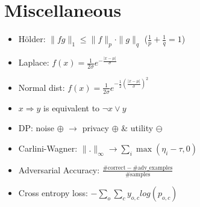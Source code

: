 \section{Miscellaneous}
\begin{itemize}
  \item Hölder: $\|fg\|_1\leq\|f\|_p\cdot\|g\|_q$ ($\frac{1}{p}+\frac{1}{q}=1$)
  \item Laplace: $f(x)=\frac{1}{2\sigma}e^{-\frac{|x-\mu|}{\sigma}}$
  \item Normal dist: $f(x)=\frac{1}{2\sigma}e^{-\frac{1}{2}(\frac{|x-\mu|}{\sigma})^2}$
  \item $x\Rightarrow y$ is equivalent to $\neg x \lor y$
  \item DP: noise $\oplus$ $\rightarrow$ privacy $\oplus$ \& utility $\ominus$
  \item Carlini-Wagner: $\|.\|_{\infty}\rightarrow\sum_i \max(\eta_i-\tau,0)$
  \item Adversarial Accuracy: $\frac{\#\text{correct} - \#\text {adv\_examples}}{\#\text{samples}}$
  \item Cross entropy loss: $-\sum_o\sum_c y_{o,c}log(p_{o,c})$
\end{itemize}

